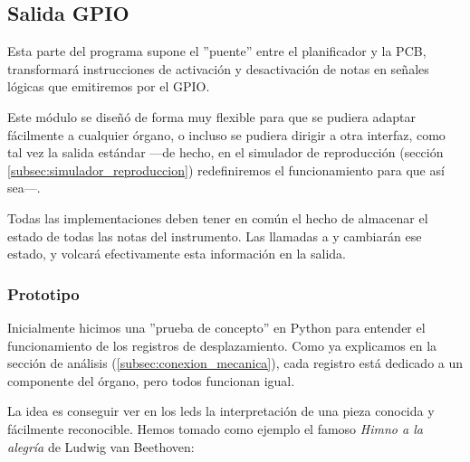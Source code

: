\subsection{Salida GPIO}

Esta parte del programa supone el ''puente'' entre el planificador y la \acrshort{PCB}, transformará instrucciones de activación y desactivación de notas en señales lógicas que emitiremos por el \acrshort{GPIO}. 

Este módulo se diseñó de forma muy flexible para que se pudiera adaptar fácilmente a cualquier órgano, o incluso se pudiera dirigir a otra interfaz, como tal vez la salida estándar ---de hecho, en el simulador de reproducción (sección \ref{subsec:simulador_reproduccion}) redefiniremos el funcionamiento para que así sea---.

Todas las implementaciones deben tener en común el hecho de almacenar el estado de todas las notas del instrumento. Las llamadas a  y  cambiarán ese estado, y  volcará efectivamente esta información en la salida.

\subsubsection{Prototipo}

Inicialmente hicimos una ''prueba de concepto'' en Python para entender el funcionamiento de los registros de desplazamiento. Como ya explicamos en la sección de análisis (\ref{subsec:conexion_mecanica}), cada registro está dedicado a un componente del órgano, pero todos funcionan igual.

La idea es conseguir ver en los \acrshort{led}s la interpretación de una pieza conocida y fácilmente reconocible. Hemos tomado como ejemplo el famoso \textit{Himno a la alegría} de Ludwig van Beethoven:

\smallskip

